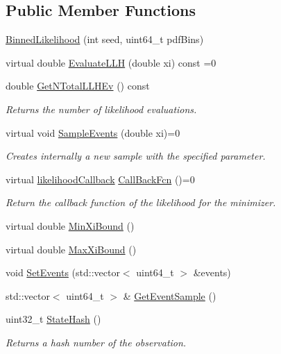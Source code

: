 \subsection*{Public Member Functions}
\begin{DoxyCompactItemize}
\item 
\hyperlink{classBinnedLikelihood_acbe8047236d7d3a90f746cdb392eb36f}{Binned\-Likelihood} (int seed, uint64\-\_\-t pdf\-Bins)
\item 
virtual double \hyperlink{classBinnedLikelihood_a2084a64cd8b5d6bf8055538a0f633785}{Evaluate\-L\-L\-H} (double xi) const =0
\item 
double \hyperlink{classBinnedLikelihood_a53d5e07ccbb7b7a5d8c85aeb8f31aa79}{Get\-N\-Total\-L\-L\-H\-Ev} () const 
\begin{DoxyCompactList}\small\item\em Returns the number of likelihood evaluations. \end{DoxyCompactList}\item 
virtual void \hyperlink{classBinnedLikelihood_a0793b8109912c6e509470a14a58d2a2a}{Sample\-Events} (double xi)=0
\begin{DoxyCompactList}\small\item\em Creates internally a new sample with the specified parameter. \end{DoxyCompactList}\item 
virtual \hyperlink{Likelihood_8h_a97d92c5c141f28319e7e8198defc9084}{likelihood\-Callback} \hyperlink{classBinnedLikelihood_aed7e05d58a36f515afc8e34fe8550b31}{Call\-Back\-Fcn} ()=0
\begin{DoxyCompactList}\small\item\em Return the callback function of the likelihood for the minimizer. \end{DoxyCompactList}\item 
virtual double \hyperlink{classBinnedLikelihood_a16f5c7acb008393fcdb12df2524d7033}{Min\-Xi\-Bound} ()
\item 
virtual double \hyperlink{classBinnedLikelihood_ab6144b4d092744dc9d5ee58a491bf77d}{Max\-Xi\-Bound} ()
\item 
void \hyperlink{classBinnedLikelihood_a823016c8e7517bce493f6e3e85559aa9}{Set\-Events} (std\-::vector$<$ uint64\-\_\-t $>$ \&events)
\item 
std\-::vector$<$ uint64\-\_\-t $>$ \& \hyperlink{classBinnedLikelihood_a719edb162d4e030220ebb30374f93eeb}{Get\-Event\-Sample} ()
\item 
uint32\-\_\-t \hyperlink{classBinnedLikelihood_a8b6371a5da5acc90bc1d601422bb9764}{State\-Hash} ()
\begin{DoxyCompactList}\small\item\em Returns a hash number of the observation. \end{DoxyCompactList}\end{DoxyCompactItemize}
